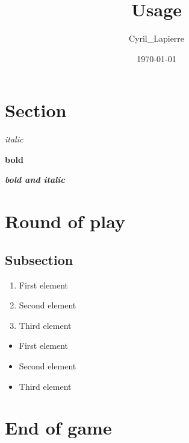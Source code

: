 \documentclass{article}%
\title{Usage}%
\author{Cyril\_Lapierre}%
\date{\today}%
\begin{document}
%
\pagestyle{empty}%
\normalsize%
\maketitle%
\section{ Section
}%
\label{sec:Section}%
\textit{italic}%

%
\textbf{bold}%

%
\textbf{\textit{bold and italic}}%



%
\section{ Round of play
}%
\label{sec:Roundofplay}%

%
\subsection{ Subsection
}%
\label{subsec:Subsection}%
\begin{enumerate}%
\item%
%
 First element
%
\item%
%
 Second element
%
\item%
%
 Third element
%
\end{enumerate}%
\begin{itemize}%
\item%
%
 First element
%
\item%
%
 Second element
%
\item%
%
 Third element
%
\end{itemize}

%
\section{ End of game}%
\label{sec:Endofgame}%

%
\end{document}
